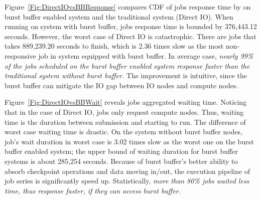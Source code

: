 
Figure~\ref{Fig:DirectIOvsBBResponse} compares CDF of jobs response
time by on burst buffer enabled system and the traditional system (Direct IO).
When running on system with burst buffer,
jobs response time is bounded by 376,443.12 seconds.
However, the worst case of Direct IO is catastrophic.
There are jobs that takes 889,239.20 seconds to finish,
which is 2.36 times slow as the most non-responsive job
in system equipped with burst buffer.
In average case, \textit{nearly 99\% of the jobs scheduled on the burst buffer enabled system
response faster than the traditional system without burst buffer.}
The improvement is intuitive, since the burst buffer can mitigate the IO gap between
IO nodes and compute nodes.



Figure~\ref{Fig:DirectIOvsBBWait} reveals jobs aggregated waiting time.
Noticing that in the case of Direct IO, jobs only request compute nodes.
Thus, waiting time is the duration between submission
and starting to run.
The difference of worst case waiting time is drastic.
On the system without burst buffer nodes, job's wait duration in worst case is 3.02 times
slow as the worst one on the burst buffer enabled system;
the upper bound of waiting duration for burst buffer systems is about 285,254 seconds.
Because of burst buffer's better ability to
absorb checkpoint operations and data moving in/out,
the execution pipeline of job series is significantly speed up.
Statistically, \textit{more than 80\% jobs waited less time, thus response faster,
if they can access burst buffer.}

